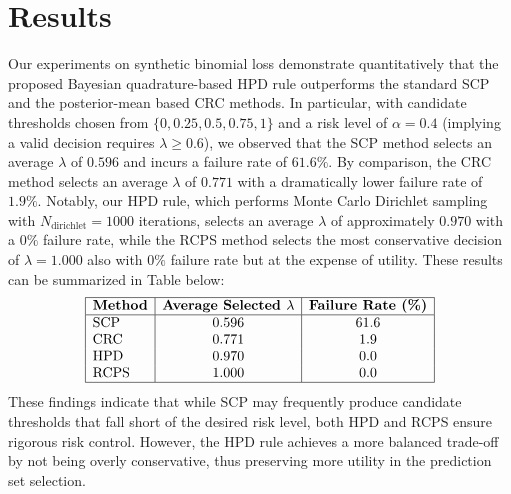 \documentclass{article} %
\begin{document}
\section{Results}
Our experiments on synthetic binomial loss demonstrate quantitatively that the proposed Bayesian quadrature-based HPD rule outperforms the standard SCP and the posterior-mean based CRC methods. In particular, with candidate thresholds chosen from \(\{0, 0.25, 0.5, 0.75, 1\}\) and a risk level of \(\alpha = 0.4\) (implying a valid decision requires \(\lambda \geq 0.6\)), we observed that the SCP method selects an average \(\lambda\) of \(0.596\) and incurs a failure rate of \(61.6\%\). By comparison, the CRC method selects an average \(\lambda\) of \(0.771\) with a dramatically lower failure rate of \(1.9\%\). Notably, our HPD rule, which performs Monte Carlo Dirichlet sampling with \(N_{\text{dirichlet}} = 1000\) iterations, selects an average \(\lambda\) of approximately \(0.970\) with a \(0\%\) failure rate, while the RCPS method selects the most conservative decision of \(\lambda = 1.000\) also with \(0\%\) failure rate but at the expense of utility. These results can be summarized in Table below:
\[
\begin{array}{|l|c|c|}
\hline
\textbf{Method} & \textbf{Average Selected } \lambda & \textbf{Failure Rate (\%)} \\
\hline
\text{SCP} & 0.596 & 61.6 \\
\text{CRC} & 0.771 & 1.9 \\
\text{HPD} & 0.970 & 0.0 \\
\text{RCPS} & 1.000 & 0.0 \\
\hline
\end{array}
\]
These findings indicate that while SCP may frequently produce candidate thresholds that fall short of the desired risk level, both HPD and RCPS ensure rigorous risk control. However, the HPD rule achieves a more balanced trade-off by not being overly conservative, thus preserving more utility in the prediction set selection.
\end{document}
